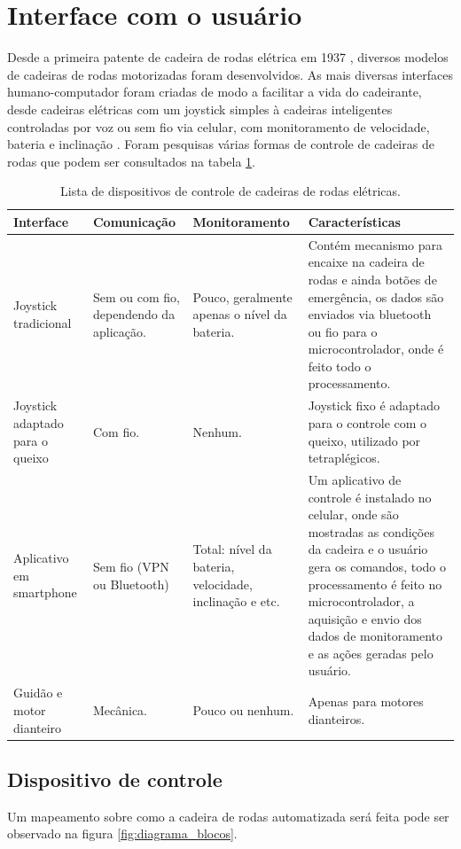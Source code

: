 \section{Interface com o usuário}
Desde a primeira patente de cadeira de rodas elétrica em 1937 \cite{patent_cadeira_rodas_eletrica}, diversos modelos de cadeiras de rodas motorizadas foram desenvolvidos. As mais diversas interfaces humano-computador foram criadas de modo a facilitar a vida do cadeirante, desde cadeiras elétricas com um joystick simples à cadeiras inteligentes controladas por voz ou sem fio via celular, com monitoramento de velocidade, bateria e inclinação \cite{artigo_controle_cadeira_eletrica}. Foram pesquisas várias formas de controle de cadeiras de rodas que podem ser consultados na tabela \ref{tab:interfaces}.

\begin{table}[!htb]
\centering
\begin{tabular}{|p{2cm}|p{3cm}|p{3cm}|p{4cm}|}
\hline
Interface & Comunicação & Monitoramento & Características \\ \hline
Joystick tradicional & Sem ou com fio, dependendo da aplicação. & Pouco, geralmente apenas o nível da bateria. & Contém mecanismo para encaixe na cadeira de rodas e ainda botões de emergência, os dados são enviados via bluetooth ou fio para o microcontrolador, onde é feito todo o processamento. \\ \hline
Joystick adaptado para o queixo & Com fio. & Nenhum. & Joystick fixo é adaptado para o controle com o queixo, utilizado por tetraplégicos. \\ \hline
Aplicativo em smartphone & Sem fio (VPN ou Bluetooth) & Total: nível da bateria, velocidade, inclinação e etc. & Um aplicativo de controle é instalado no celular, onde são mostradas as condições da cadeira e o usuário gera os comandos, todo o processamento é feito no microcontrolador, a aquisição e envio dos dados de monitoramento e as ações geradas pelo usuário. \\ \hline
Guidão e motor dianteiro & Mecânica. & Pouco ou nenhum. & Apenas para motores dianteiros. \\ \hline
\end{tabular}
\caption{Lista de dispositivos de controle de cadeiras de rodas elétricas.}
\label{tab:interfaces}
\end{table}

\subsection{Dispositivo de controle}
Um mapeamento sobre como a cadeira de rodas automatizada será feita pode ser observado na figura \ref{fig:diagrama_blocos}.

